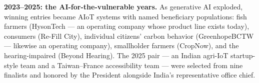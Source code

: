 \textbf{2023--2025: the AI-for-the-vulnerable years.} As generative AI
exploded, winning entries became AIoT systems with named beneficiary
populations: fish farmers (HysonTech --- an operating company whose product
line exists today\cite{hyson}), consumers (Re-Fill City), individual citizens'
carbon behavior (GreenhopeBCTW --- likewise an operating
company\cite{greenhope}), smallholder farmers (CropNow), and the
hearing-impaired (Beyond Hearing). The 2025 pair --- an Indian agri-IoT
startup-style team and a Taiwan--France accessibility team --- were selected
from nine finalists and honored by the President alongside India's
representative office chief\cite{focuscrop}.
